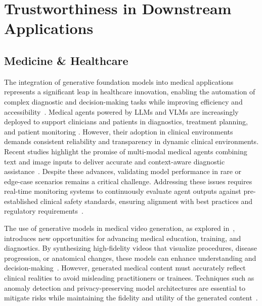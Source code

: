 \clearpage
\section{Trustworthiness in Downstream Applications}
\label{sec:application}





\subsection{Medicine \& Healthcare}

The integration of generative foundation models into medical applications represents a significant leap in healthcare innovation, enabling the automation of complex diagnostic and decision-making tasks while improving efficiency and accessibility~\cite{zhou2024ttt, yang2023harnessing, hao2025retrospective}. Medical agents powered by LLMs and VLMs are increasingly deployed to support clinicians and patients in diagnostics, treatment planning, and patient monitoring \cite{hao2024advancing}. However, their adoption in clinical environments demands consistent reliability and transparency in dynamic clinical environments. Recent studies highlight the promise of multi-modal medical agents combining text and image inputs to deliver accurate and context-aware diagnostic assistance~\cite{dai2023ad}. Despite these advances, validating model performance in rare or edge-case scenarios remains a critical challenge. Addressing these issues requires real-time monitoring systems to continuously evaluate agent outputs against pre-established clinical safety standards, ensuring alignment with best practices and regulatory requirements~\cite{ma2024eye}.

The use of generative models in medical video generation, as explored in~\cite{li2024echopulse, reynaud2024echonet, reynaud2023feature}, introduces new opportunities for advancing medical education, training, and diagnostics. By synthesizing high-fidelity videos that visualize procedures, disease progression, or anatomical changes, these models can enhance understanding and decision-making~\cite{liu2024fine}. However, generated medical content must accurately reflect clinical realities to avoid misleading practitioners or trainees. Techniques such as anomaly detection and privacy-preserving model architectures are essential to mitigate risks while maintaining the fidelity and utility of the generated content~\cite{yan2024biomedical}.

